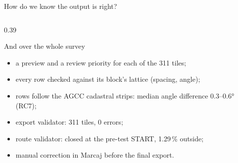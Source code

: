 \begin{frame}{How do we know the output is right?}
\begin{columns}[T]
\begin{column}{0.39\textwidth}
\begin{sxcard}{And over the whole survey}
\begin{itemize}
          \item a preview and a review priority for each of the 311 tiles;
          \item every row checked against its block's lattice (spacing, angle);
          \item rows follow the AGCC cadastral strips: median angle difference 0.3--0.6° (RC7);
          \item export validator: 311 tiles, 0 errors;
          \item route validator: closed at the pre-test START, 1.29\,\% outside;
          \item manual correction in Marcaj before the final export.
        \end{itemize}
      \end{sxcard}
    \end{column}
  \end{columns}
\end{frame}

